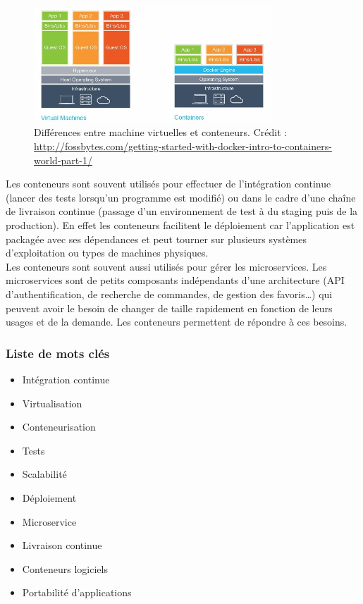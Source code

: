     \begin{figure}[h]
      \centering
      \includegraphics[width=0.8\textwidth]{images/vms-containers.jpg}
      \caption{Différences entre machine virtuelles et conteneurs. Crédit : \url{http://fossbytes.com/getting-started-with-docker-intro-to-containers-world-part-1/}}
      \label{fig:vms-containers}
    \end{figure}

    Les conteneurs sont souvent utilisés pour effectuer de l'intégration continue (lancer des tests lorsqu'un programme est modifié) ou dans le cadre d'une chaîne de livraison continue (passage d'un environnement de test à du staging puis de la production). En effet les conteneurs facilitent le déploiement car l'application est packagée avec ses dépendances et peut tourner sur plusieurs systèmes d'exploitation ou types de machines physiques.\\

    Les conteneurs sont souvent aussi utilisés pour gérer les microservices. Les microservices sont de petits composants indépendants d'une architecture (API d'authentification, de recherche de commandes, de gestion des favoris\dots) qui peuvent avoir le besoin de changer de taille rapidement en fonction de leurs usages et de la demande. Les conteneurs permettent de répondre à ces besoins.

    \subsubsection*{Liste de mots clés}
        \begin{itemize}
            \item Intégration continue
            \item Virtualisation
            \item Conteneurisation
            \item Tests
            \item Scalabilité
            \item Déploiement
            \item Microservice
            \item Livraison continue
            \item Conteneurs logiciels
            \item Portabilité d'applications
        \end{itemize}

